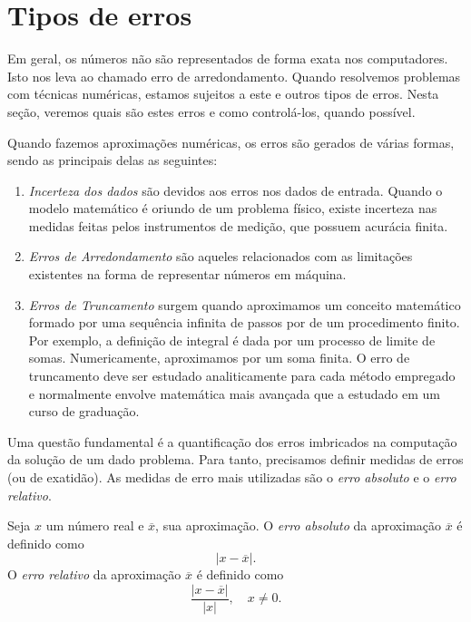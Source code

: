 \section{Tipos de erros}

Em geral, os números não são representados de forma exata nos computadores. Isto nos leva ao chamado erro de arredondamento. Quando resolvemos problemas com técnicas numéricas, estamos sujeitos a este e outros tipos de erros. Nesta seção, veremos quais são estes erros e como controlá-los, quando possível.

Quando fazemos aproximações numéricas, os erros são gerados de várias formas, sendo as principais delas as seguintes:
\begin{enumerate}
\item \emph{Incerteza dos dados} são devidos aos erros nos dados de entrada. Quando o modelo matemático é oriundo de um problema físico, existe incerteza nas medidas feitas pelos instrumentos de medição, que possuem acurácia finita.
\item \emph{Erros de Arredondamento} são aqueles relacionados com as limitações existentes na forma de representar números em máquina.
\item \emph{Erros de Truncamento} surgem quando aproximamos um conceito matemático formado por uma sequência infinita de passos por de um procedimento finito. Por exemplo, a definição de integral é dada por um processo de limite de somas. Numericamente, aproximamos por um soma finita. O erro de truncamento deve ser estudado analiticamente para cada método empregado e normalmente envolve matemática mais avançada que a estudado em um curso de graduação.
\end{enumerate}

Uma questão fundamental é a quantificação dos erros imbricados na computação da solução de um dado problema. Para tanto, precisamos definir medidas de erros (ou de exatidão). As medidas de erro mais utilizadas são o \emph{erro absoluto} e o \emph{erro relativo}.

\begin{defn} Seja $x$ um número real e $\overline{x}$, sua aproximação. O \emph{erro absoluto} da aproximação $\overline{x}$ é definido como
  \begin{equation*}
    |x-\overline{x}|.
  \end{equation*}
O \emph{erro relativo} da aproximação $\overline{x}$ é definido como
\begin{equation*}
\frac{|x-\overline{x}|}{|x|},\quad x\neq 0.
\end{equation*}
\end{defn}


